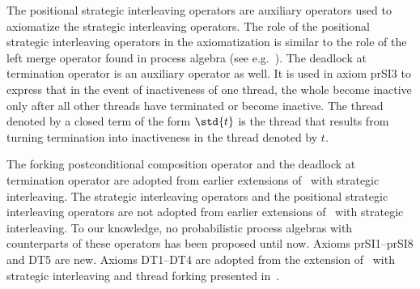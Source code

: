 \documentclass{llncs}
\begin{document}
The positional strategic interleaving operators are auxiliary operators 
used to axiomatize the strategic interleaving operators.
The role of the positional strategic interleaving operators in the 
axiomatization is similar to the role of the left merge operator found 
in process algebra (see e.g.~\cite{BW90}).
The deadlock at termination operator is an auxiliary operator as well.
It is used in axiom prSI3 to express that in the event of inactiveness 
of one thread, the whole become inactive only after all other threads 
have terminated or become inactive.
The thread denoted by a closed term of the form $\std{t}$ is the thread
that results from turning termination into inactiveness in the thread
denoted by $t$.

The forking postconditional composition operator and the deadlock at 
termination operator are adopted from earlier extensions of \BTA\ with 
strategic interleaving.
The strategic interleaving operators and the positional strategic 
interleaving operators are not adopted from earlier extensions of \BTA\ 
with strategic interleaving.
To our knowledge, no probabilistic process algebras with counterparts of 
these operators has been proposed until now. 
Axioms prSI1--prSI8 and DT5 are new.
Axioms DT1--DT4 are adopted from the extension of \BTA\ with strategic
interleaving and thread forking presented in~\cite{BM06c}.
\end{document}
